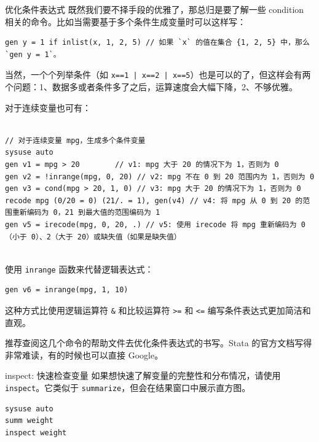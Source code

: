 \documentclass[
  ignorenonframetext,
  aspectratio=169,
  fontset=ubuntu]{ctexbeamer}
\begin{document}
\begin{frame}[fragile]{优化条件表达式}
\label{ux4f18ux5316ux6761ux4ef6ux8868ux8fbeux5f0f}
既然我们要不择手段的优雅了，那总归是要了解一些 condition
相关的命令。比如当需要基于多个条件生成变量时可以这样写：

\begin{verbatim}
gen y = 1 if inlist(x, 1, 2, 5) // 如果 `x` 的值在集合 {1, 2, 5} 中，那么 `gen y = 1`。
\end{verbatim}

当然，一个个列举条件（如
\texttt{x==1 | x==2 | x==5}）也是可以的了，但这样会有两个问题：1、数据多或者条件多了之后，运算速度会大幅下降，2、不够优雅。

对于连续变量也可有：

\begin{verbatim}

// 对于连续变量 mpg，生成多个条件变量
sysuse auto
gen v1 = mpg > 20        // v1: mpg 大于 20 的情况下为 1，否则为 0
gen v2 = !inrange(mpg, 0, 20) // v2: mpg 不在 0 到 20 范围内为 1，否则为 0
gen v3 = cond(mpg > 20, 1, 0) // v3: mpg 大于 20 的情况下为 1，否则为 0
recode mpg (0/20 = 0) (21/. = 1), gen(v4) // v4: 将 mpg 从 0 到 20 的范围重新编码为 0，21 到最大值的范围编码为 1
gen v5 = irecode(mpg, 0, 20, .) // v5: 使用 irecode 将 mpg 重新编码为 0（小于 0）、2（大于 20）或缺失值（如果是缺失值）


\end{verbatim}

使用 \texttt{inrange} 函数来代替逻辑表达式：

\begin{verbatim}
gen v6 = inrange(mpg, 1, 10)
\end{verbatim}

这种方式比使用逻辑运算符 \texttt{&} 和比较运算符
\texttt{>=} 和 \texttt{<=}
编写条件表达式更加简洁和直观。

推荐查阅这几个命令的帮助文件去优化条件表达式的书写。Stata
的官方文档写得非常难读，有的时候也可以直接 Google。
\end{frame}

\begin{frame}[fragile]{inspect: 快速检查变量}
\label{inspect-ux5febux901fux68c0ux67e5ux53d8ux91cf}
如果想快速了解变量的完整性和分布情况，请使用
\texttt{inspect}。它类似于
\texttt{summarize}，但会在结果窗口中展示直方图。

\begin{verbatim}
sysuse auto 
summ weight 
inspect weight
\end{verbatim}
\end{frame}
\end{document}
